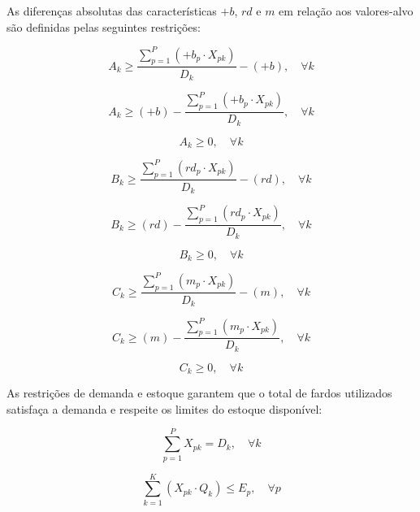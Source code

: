 \documentclass[
    12pt,                %
    openright,           %
    oneside,             %
    a4paper,             %
    english,             %
    spanish,             %
    brazil               %
]{ufscar}
\begin{document}
As diferenças absolutas das características $+b$, $rd$ e $m$ em relação aos valores-alvo são definidas pelas seguintes restrições:

\begin{equation}
A_k \geq \frac{\sum_{p=1}^{P} (+b_p \cdot X_{pk})}{D_k} - (+b), \quad \forall k
\end{equation}

\begin{equation}
A_k \geq (+b) - \frac{\sum_{p=1}^{P} (+b_p \cdot X_{pk})}{D_k}, \quad \forall k
\end{equation}

\begin{equation}
A_k \geq 0, \quad \forall k
\end{equation}

\begin{equation}
B_k \geq \frac{\sum_{p=1}^{P} (rd_p \cdot X_{pk})}{D_k} - (rd), \quad \forall k
\end{equation}

\begin{equation}
B_k \geq (rd) - \frac{\sum_{p=1}^{P} (rd_p \cdot X_{pk})}{D_k}, \quad \forall k
\end{equation}

\begin{equation}
B_k \geq 0, \quad \forall k
\end{equation}

\begin{equation}
C_k \geq \frac{\sum_{p=1}^{P} (m_p \cdot X_{pk})}{D_k} - (m), \quad \forall k
\end{equation}

\begin{equation}
C_k \geq (m) - \frac{\sum_{p=1}^{P} (m_p \cdot X_{pk})}{D_k}, \quad \forall k
\end{equation}

\begin{equation}
C_k \geq 0, \quad \forall k
\end{equation}

As restrições de demanda e estoque garantem que o total de fardos utilizados satisfaça a demanda e respeite os limites do estoque disponível:

\begin{equation}
\sum_{p=1}^{P} X_{pk} = D_k, \quad \forall k
\end{equation}

\begin{equation}
\sum_{k=1}^{K} (X_{pk} \cdot Q_k) \leq E_p, \quad \forall p
\end{equation}
\end{document}
